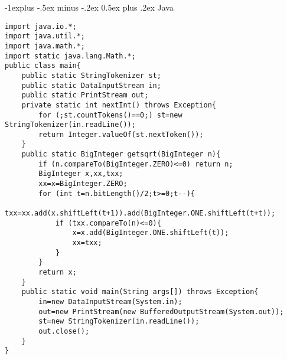 \documentclass[10pt,landscape]{article}
\makeatletter
\renewcommand{\subsection}{\@startsection{subsection}{2}{0mm}%
                                {-1explus -.5ex minus -.2ex}%
                                {0.5ex plus .2ex}%
                                {\normalfont\normalsize\bfseries}}
\makeatother
\begin{document}
\begin{multicols}{2}
\subsection{Java}
\begin{lstlisting}
import java.io.*;
import java.util.*;
import java.math.*;
import static java.lang.Math.*;
public class main{
    public static StringTokenizer st;
    public static DataInputStream in;
    public static PrintStream out;
    private static int nextInt() throws Exception{
        for (;st.countTokens()==0;) st=new StringTokenizer(in.readLine());
        return Integer.valueOf(st.nextToken());
    }
    public static BigInteger getsqrt(BigInteger n){
        if (n.compareTo(BigInteger.ZERO)<=0) return n;
        BigInteger x,xx,txx;
        xx=x=BigInteger.ZERO;
        for (int t=n.bitLength()/2;t>=0;t--){
            txx=xx.add(x.shiftLeft(t+1)).add(BigInteger.ONE.shiftLeft(t+t));
            if (txx.compareTo(n)<=0){
                x=x.add(BigInteger.ONE.shiftLeft(t));
                xx=txx;
            }
        }
        return x;
    }
    public static void main(String args[]) throws Exception{
        in=new DataInputStream(System.in);
        out=new PrintStream(new BufferedOutputStream(System.out));
        st=new StringTokenizer(in.readLine());
        out.close();
    }
}

\end{lstlisting}
\end{multicols}
\end{document}
